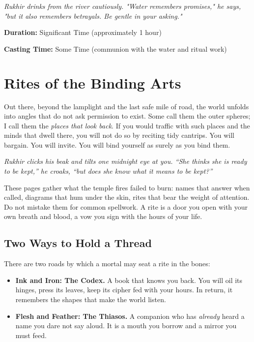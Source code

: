 \documentclass[12pt,twoside]{book}
\newcommand{\shadow}[1]{\textit{#1}}
\begin{document}
\shadow{Rukhir drinks from the river cautiously. "Water remembers promises," he says, "but it also remembers betrayals. Be gentle in your asking."}

\textbf{Duration:} Significant Time (approximately 1 hour)

\textbf{Casting Time:} Some Time (communion with the water and ritual work)


\chapter{Rites of the Binding Arts}
\label{chap:outer-rites}

\lettrine[lines=3]{O}{}ut there, beyond the lamplight and the last safe mile of road, the world unfolds into angles that do not ask permission to exist. Some call them the outer spheres; I call them the \emph{places that look back}. If you would traffic with such places and the minds that dwell there, you will not do so by reciting tidy cantrips. You will bargain. You will invite. You will bind yourself as surely as you bind them.

\shadow{Rukhir clicks his beak and tilts one midnight eye at you. ``She thinks she is ready to be \emph{kept},'' he croaks, ``but does she know what it means to be \emph{kept}?''}

These pages gather what the temple fires failed to burn: names that answer when called, diagrams that hum under the skin, rites that bear the weight of attention. Do not mistake them for common spellwork. A rite is a door you open with your own breath and blood, a vow you sign with the hours of your life.

\section*{Two Ways to Hold a Thread}
There are two roads by which a mortal may seat a rite in the bones:

\begin{itemize}
  \item \textbf{Ink and Iron: The Codex.} A book that knows you back. You will oil its hinges, press its leaves, keep its cipher fed with your hours. In return, it remembers the shapes that make the world listen.
  \item \textbf{Flesh and Feather: The Thiasos.} A companion who has \emph{already} heard a name you dare not say aloud. It is a mouth you borrow and a mirror you must feed.
\end{itemize}
\end{document}
